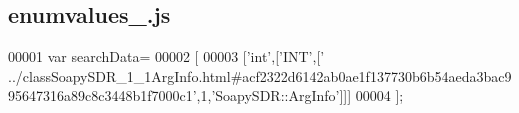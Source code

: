\subsection{enumvalues\+\_.\+js}
\label{enumvalues__4_8js_source}

\begin{DoxyCode}
00001 var searchData=
00002 [
00003   [\textcolor{stringliteral}{'int'},[\textcolor{stringliteral}{'INT'},[\textcolor{stringliteral}{'
      ../classSoapySDR\_1\_1ArgInfo.html#acf2322d6142ab0ae1f137730b6b54aeda3bac995647316a89c8c3448b1f7000c1'},1,\textcolor{stringliteral}{'SoapySDR::ArgInfo'}]]]
00004 ];
\end{DoxyCode}
